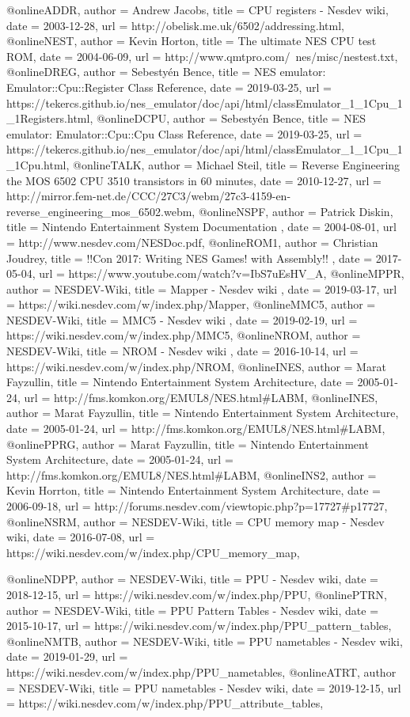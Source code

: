@online{ADDR,
	author = {Andrew Jacobs},
	title = {CPU registers - Nesdev wiki},
	date = {2003-12-28},
	url = {http://obelisk.me.uk/6502/addressing.html},
}
@online{NEST,
	author = {Kevin Horton},
	title = {The ultimate NES CPU test ROM},
	date = {2004-06-09},
	url = {http://www.qmtpro.com/~nes/misc/nestest.txt},
}
@online{DREG,
	author = {Sebestyén Bence},
	title = {NES emulator: Emulator::Cpu::Register Class Reference},
	date = {2019-03-25},
	url = {https://tekercs.github.io/nes_emulator/doc/api/html/classEmulator_1_1Cpu_1_1Registers.html},
}
@online{DCPU,
	author = {Sebestyén Bence},
	title = {NES emulator: Emulator::Cpu::Cpu Class Reference},
	date = {2019-03-25},
	url = {https://tekercs.github.io/nes_emulator/doc/api/html/classEmulator_1_1Cpu_1_1Cpu.html},
}
@online{TALK,
	author = {Michael Steil},
	title = {Reverse Engineering the MOS 6502 CPU 3510 transistors in 60 minutes},
	date = {2010-12-27},
	url = {http://mirror.fem-net.de/CCC/27C3/webm/27c3-4159-en-reverse_engineering_mos_6502.webm},
}
@online{NSPF,
	author = {Patrick Diskin},
	title = {Nintendo Entertainment System Documentation },
	date = {2004-08-01},
	url = {http://www.nesdev.com/NESDoc.pdf},
}
@online{ROM1,
	author = {Christian Joudrey},
	title = {!!Con 2017: Writing NES Games! with Assembly!! },
	date = {2017-05-04},
	url = {https://www.youtube.com/watch?v=IbS7uEsHV_A},
}
@online{MPPR,
	author = {NESDEV-Wiki},
	title = {Mapper - Nesdev wiki },
	date = {2019-03-17},
	url = {https://wiki.nesdev.com/w/index.php/Mapper},
}
@online{MMC5,
	author = {NESDEV-Wiki},
	title = {MMC5 - Nesdev wiki },
	date = {2019-02-19},
	url = {https://wiki.nesdev.com/w/index.php/MMC5},
}
@online{NROM,
	author = {NESDEV-Wiki},
	title = {NROM - Nesdev wiki },
	date = {2016-10-14},
	url = {https://wiki.nesdev.com/w/index.php/NROM},
}
@online{INES,
	author = {Marat Fayzullin},
	title = {Nintendo Entertainment System Architecture},
	date = {2005-01-24},
	url = {http://fms.komkon.org/EMUL8/NES.html#LABM},
}
@online{INES,
	author = {Marat Fayzullin},
	title = {Nintendo Entertainment System Architecture},
	date = {2005-01-24},
	url = {http://fms.komkon.org/EMUL8/NES.html#LABM},
}
@online{PPRG,
	author = {Marat Fayzullin},
	title = {Nintendo Entertainment System Architecture},
	date = {2005-01-24},
	url = {http://fms.komkon.org/EMUL8/NES.html#LABM},
}
@online{INS2,
	author = {Kevin Horrton},
	title = {Nintendo Entertainment System Architecture},
	date = {2006-09-18},
	url = {http://forums.nesdev.com/viewtopic.php?p=17727#p17727},
}
@online{NSRM,
	author = {NESDEV-Wiki},
	title = {CPU memory map - Nesdev wiki},
	date = {2016-07-08},
	url = {https://wiki.nesdev.com/w/index.php/CPU_memory_map},
}

@online{NDPP,
	author = {NESDEV-Wiki},
	title = {PPU - Nesdev wiki},
	date = {2018-12-15},
	url = {https://wiki.nesdev.com/w/index.php/PPU},
}
@online{PTRN,
	author = {NESDEV-Wiki},
	title = {PPU Pattern Tables - Nesdev wiki},
	date = {2015-10-17},
	url = {https://wiki.nesdev.com/w/index.php/PPU_pattern_tables},
}
@online{NMTB,
	author = {NESDEV-Wiki},
	title = {PPU nametables - Nesdev wiki},
	date = {2019-01-29},
	url = {https://wiki.nesdev.com/w/index.php/PPU_nametables},
}
@online{ATRT,
	author = {NESDEV-Wiki},
	title = {PPU nametables - Nesdev wiki},
	date = {2019-12-15},
	url = {https://wiki.nesdev.com/w/index.php/PPU_attribute_tables},
}